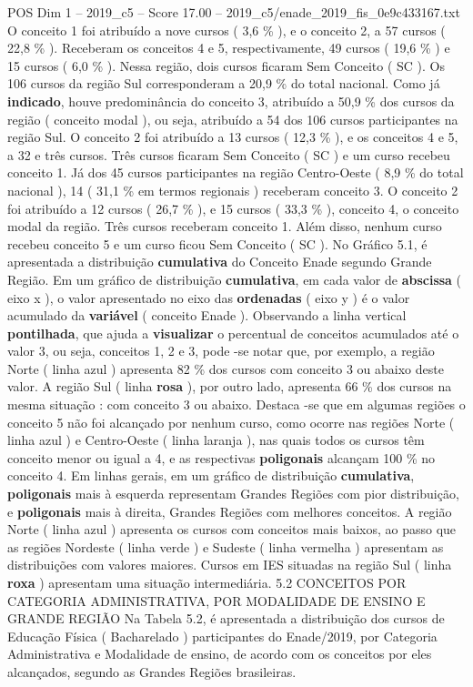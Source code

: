 \begin{textsample}{POS Dim 1 – 2019\_c5 – Score 17.00 – 2019\_c5/enade\_2019\_fis\_0e9c433167.txt}
O conceito 1 foi atribuído a nove cursos ( 3,6 \% ), e o conceito 2, a 57 cursos ( 22,8 \% ).
Receberam os conceitos 4 e 5, respectivamente, 49 cursos ( 19,6 \% ) e 15 cursos ( 6,0 \% ).
Nessa região, dois cursos ficaram Sem Conceito ( SC ).
Os 106 cursos da região Sul corresponderam a 20,9 \% do total nacional.
Como já \textbf{indicado}, houve predominância do conceito 3, atribuído a 50,9 \% dos cursos da região ( conceito modal ), ou seja, atribuído a 54 dos 106 cursos participantes na região Sul.
O conceito 2 foi atribuído a 13 cursos ( 12,3 \% ), e os conceitos 4 e 5, a 32 e três cursos.
Três cursos ficaram Sem Conceito ( SC ) e um curso recebeu conceito 1.
Já dos 45 cursos participantes na região Centro-Oeste ( 8,9 \% do total nacional ), 14 ( 31,1 \% em termos regionais ) receberam conceito 3.
O conceito 2 foi atribuído a 12 cursos ( 26,7 \% ), e 15 cursos ( 33,3 \% ), conceito 4, o conceito modal da região.
Três cursos receberam conceito 1.
Além disso, nenhum curso recebeu conceito 5 e um curso ficou Sem Conceito ( SC ).
No Gráfico 5.1, é apresentada a distribuição \textbf{cumulativa} do Conceito Enade segundo Grande Região.
Em um gráfico de distribuição \textbf{cumulativa}, em cada valor de \textbf{abscissa} ( eixo x ), o valor apresentado no eixo das \textbf{ordenadas} ( eixo y ) é o valor acumulado da \textbf{variável} ( conceito Enade ).
Observando a linha vertical \textbf{pontilhada}, que ajuda a \textbf{visualizar} o percentual de conceitos acumulados até o valor 3, ou seja, conceitos 1, 2 e 3, pode -se notar que, por exemplo, a região Norte ( linha azul ) apresenta 82 \% dos cursos com conceito 3 ou abaixo deste valor.
A região Sul ( linha \textbf{rosa} ), por outro lado, apresenta 66 \% dos cursos na mesma situação : com conceito 3 ou abaixo.
Destaca -se que em algumas regiões o conceito 5 não foi alcançado por nenhum curso, como ocorre nas regiões Norte ( linha azul ) e Centro-Oeste ( linha laranja ), nas quais todos os cursos têm conceito menor ou igual a 4, e as respectivas \textbf{poligonais} alcançam 100 \% no conceito 4.
Em linhas gerais, em um gráfico de distribuição \textbf{cumulativa}, \textbf{poligonais} mais à esquerda representam Grandes Regiões com pior distribuição, e \textbf{poligonais} mais à direita, Grandes Regiões com melhores conceitos.
A região Norte ( linha azul ) apresenta os cursos com conceitos mais baixos, ao passo que as regiões Nordeste ( linha verde ) e Sudeste ( linha vermelha ) apresentam as distribuições com valores maiores.
Cursos em IES situadas na região Sul ( linha \textbf{roxa} ) apresentam uma situação intermediária. 5.2 CONCEITOS POR CATEGORIA ADMINISTRATIVA, POR MODALIDADE DE ENSINO E GRANDE REGIÃO Na Tabela 5.2, é apresentada a distribuição dos cursos de Educação Física ( Bacharelado ) participantes do Enade/2019, por Categoria Administrativa e Modalidade de ensino, de acordo com os conceitos por eles alcançados, segundo as Grandes Regiões brasileiras.

\end{textsample}
